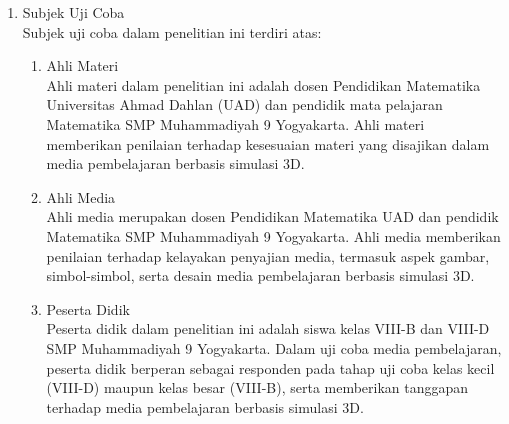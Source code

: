 \begin{enumerate}
    \item Subjek Uji Coba\\
    \hspace*{1cm}Subjek uji coba dalam penelitian ini terdiri atas:
    \begin{enumerate}
        \item Ahli Materi\\
        Ahli materi dalam penelitian ini adalah dosen Pendidikan Matematika Universitas Ahmad Dahlan (UAD) dan pendidik mata pelajaran Matematika SMP Muhammadiyah 9 Yogyakarta. Ahli materi memberikan penilaian terhadap kesesuaian materi yang disajikan dalam media pembelajaran berbasis simulasi 3D.
        \item Ahli Media\\
        Ahli media merupakan dosen Pendidikan Matematika UAD dan pendidik Matematika SMP Muhammadiyah 9 Yogyakarta. Ahli media memberikan penilaian terhadap kelayakan penyajian media, termasuk aspek gambar, simbol-simbol, serta desain media pembelajaran berbasis simulasi 3D.
        \item Peserta Didik\\
        Peserta didik dalam penelitian ini adalah siswa kelas VIII-B dan VIII-D SMP Muhammadiyah 9 Yogyakarta. Dalam uji coba media pembelajaran, peserta didik berperan sebagai responden pada tahap uji coba kelas kecil (VIII-D) maupun kelas besar (VIII-B), serta memberikan tanggapan terhadap media pembelajaran berbasis simulasi 3D.
    \end{enumerate}


\end{enumerate}
